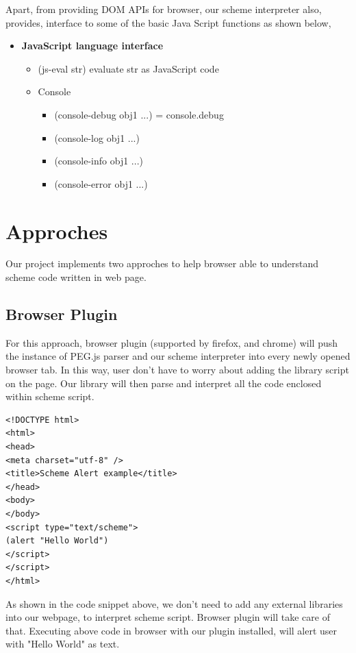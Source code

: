 Apart, from providing DOM APIs for browser, our scheme interpreter also, provides, interface to some of the basic Java Script functions as shown below, 


\begin{itemize}
	\item{\textbf{JavaScript language interface}}
	\begin{itemize}
		\item {(js-eval str) evaluate str as JavaScript code}
	\end{itemize}

	\begin{itemize}
		\item Console
		\begin{itemize}
			\item {(console-debug obj1 ...) = console.debug}
			\item {(console-log obj1 ...)}
			\item {(console-info obj1 ...)}
			\item {(console-error obj1 ...)}
		\end{itemize}
\end{itemize}
\end{itemize}


\section{Approches}

Our project implements two approches to help browser able to understand scheme code written in web page.

\subsection{Browser Plugin } 
For this approach, browser plugin (supported by firefox, and chrome) will push the instance of PEG.js parser and our scheme interpreter into every newly opened browser tab. In this way, user don't have to worry about adding the library script on the page. Our library will then parse and interpret all the code enclosed within scheme script.

\begin{lstlisting}[frame=single]  
<!DOCTYPE html>
<html>
<head>
<meta charset="utf-8" />
<title>Scheme Alert example</title>
</head>
<body>
</body>
<script type="text/scheme">
(alert "Hello World")
</script>
</script>
</html>
\end{lstlisting}

As shown in the code snippet above, we don't need to add any external libraries into our webpage, to interpret scheme script. Browser plugin will take care of that.
Executing above code in browser with our plugin installed, will alert user with "Hello World" as text.


